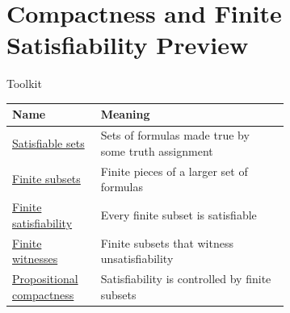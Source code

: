 \section{Compactness and Finite Satisfiability Preview}

\begin{toolkitbox}{Toolkit}
\small
\begin{tabular}{l p{0.68\linewidth}}
\toprule
\textbf{Name} & \textbf{Meaning} \\
\midrule
\hyperref[def:satisfiable-set-of-propositional-formulas]{Satisfiable sets} & Sets of formulas made true by some truth assignment \\
\hyperref[def:finite-subset-of-set-of-propositional-formulas]{Finite subsets} & Finite pieces of a larger set of formulas \\
\hyperref[def:finitely-satisfiable-set-of-propositional-formulas]{Finite satisfiability} & Every finite subset is satisfiable \\
\hyperref[def:finite-unsatisfiability-witness-propositional-logic]{Finite witnesses} & Finite subsets that witness unsatisfiability \\
\hyperref[thm:propositional-compactness]{Propositional compactness} & Satisfiability is controlled by finite subsets \\
\bottomrule
\end{tabular}
\end{toolkitbox}










